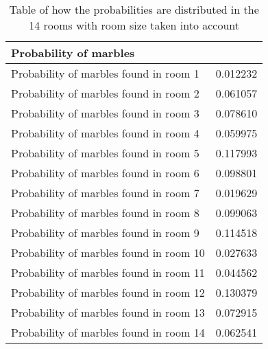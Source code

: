 \documentclass[../Head/Main.tex]{subfiles}
\begin{document}
\begin{table}[H]
	\centering
	\begin{tabular}{l r}
		\hline
		\multicolumn{2}{l}{\textbf{Probability of marbles}}  			\\ \hline
		Probability of marbles found in room 1  & 0.012232\\
		Probability of marbles found in room 2  & 0.061057\\
		Probability of marbles found in room 3  & 0.078610\\
		Probability of marbles found in room 4  & 0.059975\\
		Probability of marbles found in room 5  & 0.117993\\
		Probability of marbles found in room 6  & 0.098801\\
		Probability of marbles found in room 7  & 0.019629\\
		Probability of marbles found in room 8  & 0.099063\\
		Probability of marbles found in room 9  & 0.114518\\
		Probability of marbles found in room 10 & 0.027633\\
		Probability of marbles found in room 11 & 0.044562\\
		Probability of marbles found in room 12 & 0.130379\\
		Probability of marbles found in room 13 & 0.072915\\
		Probability of marbles found in room 14 & 0.062541\\			\hline
	\end{tabular}
	\caption{Table of how the probabilities are distributed in the 14 rooms with room size taken into account}
	\label{tab:probability_data}
\end{table}
\end{document}
